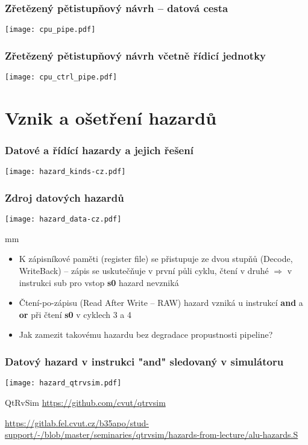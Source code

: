 \documentclass{beamer}
\begin{document}
\begin{frame}
\frametitle{Zřetězený pětistupňový návrh -- datová cesta}
\texttt{[image: cpu\_pipe.pdf]}
\end{frame}

\begin{frame}
\frametitle{Zřetězený pětistupňový návrh včetně řídicí jednotky}
\texttt{[image: cpu\_ctrl\_pipe.pdf]}
\end{frame}

\section{Vznik a ošetření hazardů}

\begin{frame}
\frametitle{Datové a řídící hazardy a jejich řešení}
\texttt{[image: hazard\_kinds-cz.pdf]}
\end{frame}

\begin{frame}
\frametitle{Zdroj datových hazardů}
\texttt{[image: hazard\_data-cz.pdf]}

 mm

\begin{itemize}
 \item K zápisníkové paměti (register file) se přistupuje ze dvou stupňů (Decode, WriteBack) --
       zápis se uskutečňuje v první půli cyklu, čtení v druhé $\Rightarrow$ v instrukci sub pro vstop \textbf{s0} hazard nevzniká
 \item Čtení-po-zápisu (Read After Write -- RAW) hazard vzniká u instrukcí
       \textbf{and} a \textbf{or} při čtení \textbf{s0} v cyklech 3 a 4
 \item Jak zamezit takovému hazardu bez degradace propustnosti pipeline?
\end{itemize}

\end{frame}


\begin{frame}
\frametitle{Datový hazard v instrukci "and" sledovaný v simulátoru}
\texttt{[image: hazard\_qtrvsim.pdf]}

{\tiny
QtRvSim \url{https://github.com/cvut/qtrvsim}
}

{\Tiny
\url{https://gitlab.fel.cvut.cz/b35apo/stud-support/-/blob/master/seminaries/qtrvsim/hazards-from-lecture/alu-hazards.S}
}

\end{frame}
\end{document}
